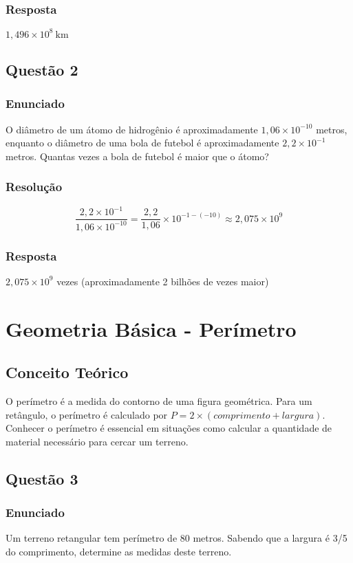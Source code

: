 \documentclass[11pt]{article}
\begin{document}
\subsubsection*{Resposta}
$\boxed{1,496 \times 10^8\ \text{km}}$

\subsection{Questão 2}
\subsubsection*{Enunciado}
O diâmetro de um átomo de hidrogênio é aproximadamente $1,06 \times 10^{-10}$ metros, enquanto o diâmetro de uma bola de futebol é aproximadamente $2,2 \times 10^{-1}$ metros. Quantas vezes a bola de futebol é maior que o átomo?

\subsubsection*{Resolução}
\[
\frac{2,2 \times 10^{-1}}{1,06 \times 10^{-10}} = \frac{2,2}{1,06} \times 10^{-1-(-10)} \approx 2,075 \times 10^9
\]

\subsubsection*{Resposta}
$\boxed{2,075 \times 10^9}$ vezes (aproximadamente 2 bilhões de vezes maior)

\section{Geometria Básica - Perímetro}

\subsection{Conceito Teórico}
O perímetro é a medida do contorno de uma figura geométrica. Para um retângulo, o perímetro é calculado por $P = 2 \times (comprimento + largura)$. Conhecer o perímetro é essencial em situações como calcular a quantidade de material necessário para cercar um terreno.

\subsection{Questão 3}
\subsubsection*{Enunciado}
Um terreno retangular tem perímetro de 80 metros. Sabendo que a largura é 3/5 do comprimento, determine as medidas deste terreno.
\end{document}
